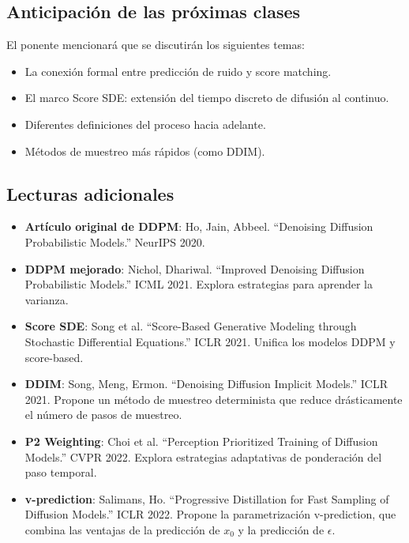 \documentclass[a4paper]{article}
\begin{document}
\subsection{Anticipación de las próximas clases}

El ponente mencionará que se discutirán los siguientes temas:
\begin{itemize}
    \item La conexión formal entre predicción de ruido y score matching.
    \item El marco Score SDE: extensión del tiempo discreto de difusión al continuo.
    \item Diferentes definiciones del proceso hacia adelante.
    \item Métodos de muestreo más rápidos (como DDIM).
\end{itemize}

\subsection{Lecturas adicionales}

\begin{itemize}
    \item \textbf{Artículo original de DDPM}: Ho, Jain, Abbeel. ``Denoising Diffusion Probabilistic Models.'' NeurIPS 2020.
    \item \textbf{DDPM mejorado}: Nichol, Dhariwal. ``Improved Denoising Diffusion Probabilistic Models.'' ICML 2021. Explora estrategias para aprender la varianza.
    \item \textbf{Score SDE}: Song et al. ``Score-Based Generative Modeling through Stochastic Differential Equations.'' ICLR 2021. Unifica los modelos DDPM y score-based.
    \item \textbf{DDIM}: Song, Meng, Ermon. ``Denoising Diffusion Implicit Models.'' ICLR 2021. Propone un método de muestreo determinista que reduce drásticamente el número de pasos de muestreo.
    \item \textbf{P2 Weighting}: Choi et al. ``Perception Prioritized Training of Diffusion Models.'' CVPR 2022. Explora estrategias adaptativas de ponderación del paso temporal.
    \item \textbf{v-prediction}: Salimans, Ho. ``Progressive Distillation for Fast Sampling of Diffusion Models.'' ICLR 2022. Propone la parametrización v-prediction, que combina las ventajas de la predicción de $x_0$ y la predicción de $\epsilon$.
\end{itemize}
\end{document}
